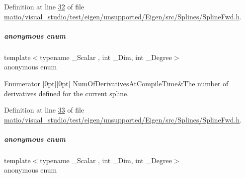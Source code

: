 Definition at line \hyperlink{matio_2visual__studio_2test_2eigen_2unsupported_2_eigen_2src_2_splines_2_spline_fwd_8h_source_l00032}{32} of file \hyperlink{matio_2visual__studio_2test_2eigen_2unsupported_2_eigen_2src_2_splines_2_spline_fwd_8h_source}{matio/visual\+\_\+studio/test/eigen/unsupported/\+Eigen/src/\+Splines/\+Spline\+Fwd.\+h}.

\mbox{\label{group___splines___module_a2da1a11e7bf2abfbedea7df9b15d9895}} 
\subparagraph{\texorpdfstring{anonymous enum}{anonymous enum}}
{\footnotesize\ttfamily template$<$typename \+\_\+\+Scalar , int \+\_\+\+Dim, int \+\_\+\+Degree$>$ \\
anonymous enum}

\begin{DoxyEnumFields}{Enumerator}
[0pt][0pt]{}\mbox{\label{group___splines___module_a2da1a11e7bf2abfbedea7df9b15d9895a88f260bd13254516bae0c12f70a12c75}} 
Num\+Of\+Derivatives\+At\+Compile\+Time&The number of derivatives defined for the current spline. \\
\hline

\end{DoxyEnumFields}


Definition at line \hyperlink{matio_2visual__studio_2test_2eigen_2unsupported_2_eigen_2src_2_splines_2_spline_fwd_8h_source_l00033}{33} of file \hyperlink{matio_2visual__studio_2test_2eigen_2unsupported_2_eigen_2src_2_splines_2_spline_fwd_8h_source}{matio/visual\+\_\+studio/test/eigen/unsupported/\+Eigen/src/\+Splines/\+Spline\+Fwd.\+h}.

\mbox{\label{group___splines___module_ac19a27ac551b6dfe70931c532c3a8ba6}} 
\subparagraph{\texorpdfstring{anonymous enum}{anonymous enum}}
{\footnotesize\ttfamily template$<$typename \+\_\+\+Scalar , int \+\_\+\+Dim, int \+\_\+\+Degree$>$ \\
anonymous enum}

